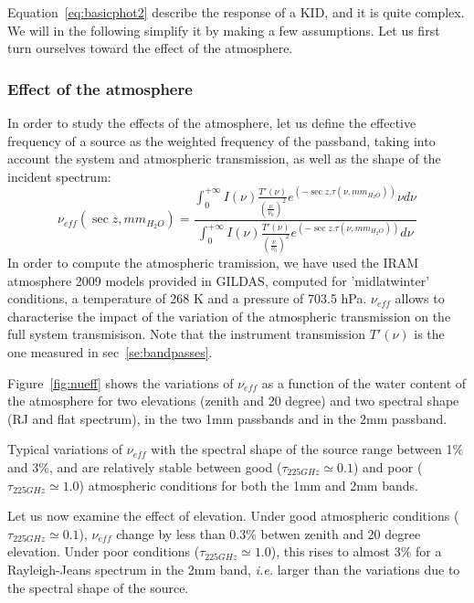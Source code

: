 Equation~\ref{eq:basicphot2} describe the response of a KID, and it
is quite complex. We will in the following simplify it by making a few
assumptions. Let us first turn ourselves toward the effect of the
atmosphere. 


\subsubsection{Effect of the atmosphere}

In order to study the effects of the atmosphere, let us define the
effective frequency of a source as the weighted frequency of the
passband, taking into account the system and atmospheric transmission,
as well as the shape of the incident spectrum:
\begin{equation}
\nu_{eff}( \sec z, mm_{H_{2}O}) = \frac{ \int_{0}^{+\infty} I(\nu) \frac{T'(\nu)}{\left(\frac{\nu}{\nu_{0}}\right)^{2}} e^{\left(-\sec z
  . \tau(\nu,  mm_{H_{2}O})\right)} \nu d\nu } { \int_{0}^{+\infty} I(\nu) \frac{T'(\nu)}{\left(\frac{\nu}{\nu_{0}}\right)^{2}} e^{\left(-\sec z
  . \tau(\nu,  mm_{H_{2}O})\right)}  d\nu}
\label{eq:nueff}
\end{equation}
In order to compute the atmospheric tramission, we have used
the IRAM atmosphere 2009 models provided in GILDAS, computed for
'midlatwinter' conditions, a temperature of 268 K  and a pressure of 703.5
hPa. $\nu_{eff}$ allows to characterise the impact of the variation of
the atmospheric transmission on the full system transmisison.  Note
that the instrument transmission $T'(\nu)$ is the one measured in
sec~\ref{se:bandpasses}. 

Figure~\ref{fig:nueff} shows the variations of
$\nu_{eff}$ as a function of the water content of the atmosphere for
two elevations (zenith and 20 degree) and two spectral shape (RJ and
flat spectrum), in the two 1mm passbands and in the 2mm passband. 

Typical variations of $\nu_{eff}$ with the spectral shape of the
source range between 1\% and 3\%, and are relatively stable between good
($\tau_{225GHz} \simeq 0.1$) and
poor  ($\tau_{225GHz} \simeq 1.0$) atmospheric conditions for both the
1mm and 2mm bands. 


Let us now examine the effect of elevation.
Under good atmospheric conditions ($\tau_{225GHz} \simeq 0.1$), $\nu_{eff}$ change by
less than 0.3\% betwen zenith and 20 degree elevation. Under poor
conditions ($\tau_{225GHz} \simeq 1.0$), this rises to almost 3\% for
a Rayleigh-Jeans spectrum in the 2mm band, {\it i.e.} larger than the
  variations due to the spectral shape of the source.



